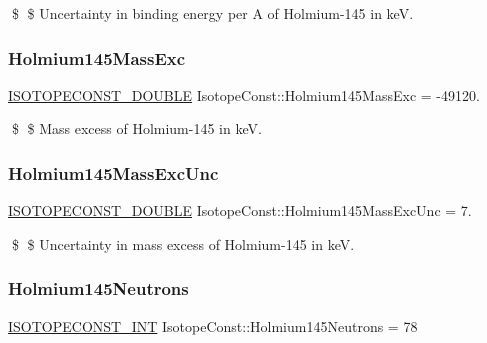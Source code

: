 \$ \$ Uncertainty in binding energy per A of Holmium-\/145 in keV. \mbox{\label{group___isotope_const-_holmium-_ho145_ga00dd8fb043698d99d8bc10357722731a}} 
\subsubsection{\texorpdfstring{Holmium145\+Mass\+Exc}{Holmium145MassExc}}
{\footnotesize\ttfamily \mbox{\hyperlink{group___isotope_const-_macros_ga8f45a7272ce02c0b4c65c44636ed719a}{I\+S\+O\+T\+O\+P\+E\+C\+O\+N\+S\+T\+\_\+\+D\+O\+U\+B\+LE}} Isotope\+Const\+::\+Holmium145\+Mass\+Exc = -\/49120.}

\$ \$ Mass excess of Holmium-\/145 in keV. \mbox{\label{group___isotope_const-_holmium-_ho145_gabb064d8774e4f59f4183df532a191fa8}} 
\subsubsection{\texorpdfstring{Holmium145\+Mass\+Exc\+Unc}{Holmium145MassExcUnc}}
{\footnotesize\ttfamily \mbox{\hyperlink{group___isotope_const-_macros_ga8f45a7272ce02c0b4c65c44636ed719a}{I\+S\+O\+T\+O\+P\+E\+C\+O\+N\+S\+T\+\_\+\+D\+O\+U\+B\+LE}} Isotope\+Const\+::\+Holmium145\+Mass\+Exc\+Unc = 7.}

\$ \$ Uncertainty in mass excess of Holmium-\/145 in keV. \mbox{\label{group___isotope_const-_holmium-_ho145_ga1568bc480cab5cd8975ada7a61612e7b}} 
\subsubsection{\texorpdfstring{Holmium145\+Neutrons}{Holmium145Neutrons}}
{\footnotesize\ttfamily \mbox{\hyperlink{group___isotope_const-_macros_ga5f18360b3e99483a35c32d789e62621c}{I\+S\+O\+T\+O\+P\+E\+C\+O\+N\+S\+T\+\_\+\+I\+NT}} Isotope\+Const\+::\+Holmium145\+Neutrons = 78}

